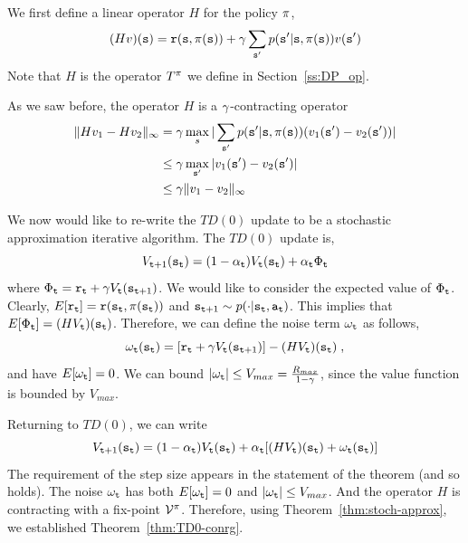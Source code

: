 We first define a linear operator $H$ for the policy $\pi$,
\[
(Hv)({\tt s})={\tt r}({\tt s},\pi({\tt s}))+\gamma\sum_{{\tt s}'}p({\tt s}'|{\tt s},\pi({\tt s}))v({\tt s}')
\]
Note that $H$ is the operator $T^\pi$ we define in
Section~\ref{ss:DP_op}.

As we saw before, the operator $H$ is a $\gamma$-contracting
operator
\begin{align*}
\|Hv_1-Hv_2\|_\infty &= \gamma \max_{s} |
\sum_{{\tt s}'}p({\tt s}'|{\tt s},\pi({\tt s}))(v_1({\tt s}')-v_2({\tt s}'))|\\
&\leq \gamma\max_{{\tt s}'} |v_1({\tt s}')-v_2({\tt s}')|\\
&\leq \gamma \|v_1-v_2\|_\infty
\end{align*}

We now would like to re-write the $TD(0)$ update to be a stochastic
approximation iterative algorithm. The $TD(0)$ update is,
\[
V_{{\tt t}+1}({\tt s}_{\tt t})=(1-\alpha_{\tt t})V_{\tt t}({\tt s}_{\tt t})+\alpha_{\tt t}
\Phi_{\tt t}
\]
where $\Phi_{\tt t}={\tt r}_{\tt t}+\gamma
V_{\tt t}({\tt s}_{{\tt t}+1})$. We would like to consider the expected
value of $\Phi_{\tt t}$. Clearly,
$E[{\tt r}_{\tt t}]={\tt r}({\tt s}_{\tt t},\pi({\tt s}_{\tt t}))$
and ${\tt s}_{{\tt t}+1} \sim p(\cdot |{\tt s}_{\tt t},{\tt a}_{\tt t})$.
This implies that $E[\Phi_{\tt t}]=(HV_{\tt t})({\tt s}_{\tt t})$.
Therefore, we can define the noise term $\omega_{\tt t}$ as follows,
\[
\omega_{\tt t}({\tt s}_{\tt t})=[{\tt r}_{\tt t}+\gamma
V_{\tt t}({\tt s}_{{\tt t}+1})]-(HV_{\tt t})({\tt s}_{\tt t})\;,
\]
and have $E[\omega_{\tt t}]=0$. We can bound $|\omega_{\tt t}|\leq
V_{max}=\frac{R_{max}}{1-\gamma}$, since the value function is
bounded by $V_{max}$.

Returning to $TD(0)$, we can write
\[
V_{{\tt t}+1}({\tt s}_{\tt t})=(1-\alpha_{\tt t})V_{\tt t}({\tt s}_{\tt t})+\alpha_{\tt t}
[(HV_{\tt t})({\tt s}_{\tt t})+\omega_{\tt t}({\tt s}_{\tt t})]
\]
The requirement of the step size appears in the statement of the
theorem (and so holds). The noise $\omega_{\tt t}$ has both
$E[\omega_{\tt t}]=0$ and $|\omega_{\tt t}|\leq V_{max}$. And the
operator $H$ is contracting with a fix-point $\mathcal{V}^\pi$.
Therefore, using Theorem~\ref{thm:stoch-approx}, we established
Theorem~\ref{thm:TD0-conrg}.

